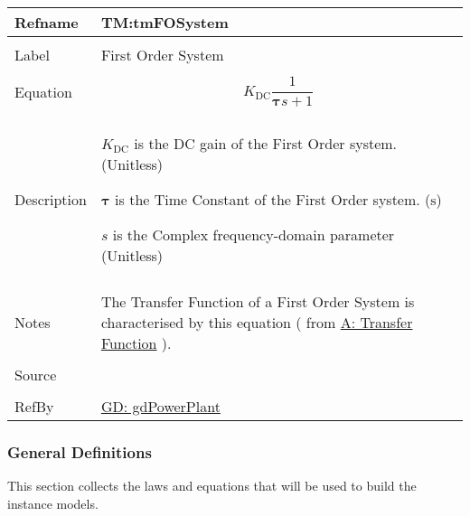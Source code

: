 \documentclass[12pt]{article}
\begin{document}
\begin{minipage}{\textwidth}
\begin{tabular}{>{\raggedright}p{}>{\raggedright\arraybackslash}p{}}
\toprule \textbf{Refname} & \textbf{TM:tmFOSystem}
\label{TM:tmFOSystem}
\\ \midrule \\
Label & First Order System
        
\\ \midrule \\
Equation & \begin{displaymath}
           {K_{\text{DC}}} \frac{1}{𝛕 s+1}
           \end{displaymath}
\\ \midrule \\
Description & \begin{symbDescription}
              \item{${K_{\text{DC}}}$ is the DC gain of the First Order system. (Unitless)}
              \item{$𝛕$ is the Time Constant of the First Order system. (${\text{s}}$)}
              \item{$s$ is the Complex frequency-domain parameter (Unitless)}
              \end{symbDescription}
\\ \midrule \\
Notes & The  Transfer Function  of a  First Order System is characterised by this equation ( from \hyperref[pwrPlantTxFnx]{A: Transfer Function} ).
        
\\ \midrule \\
Source & \cite{electrical4UWiki}
         
\\ \midrule \\
RefBy & \hyperref[GD:gdPowerPlant]{GD: gdPowerPlant}
        
\\ \bottomrule
\end{tabular}
\end{minipage}
\subsubsection{General Definitions}
\label{Sec:GDs}
This section collects the laws and equations that will be used to build the instance models.
\end{document}
